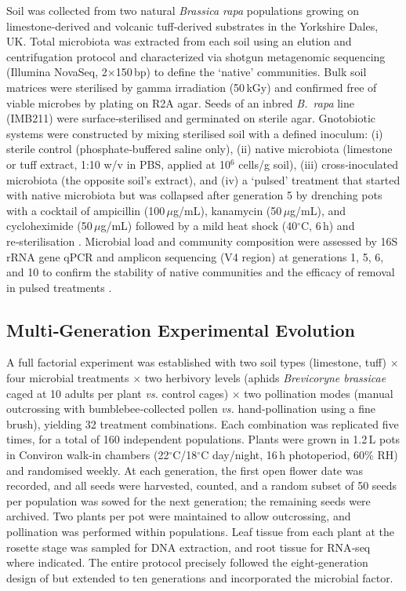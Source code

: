 \documentclass{article}
\begin{document}
Soil was collected from two natural \emph{Brassica rapa} populations growing on limestone‑derived and volcanic tuff‑derived substrates in the Yorkshire Dales, UK. Total microbiota was extracted from each soil using an elution and centrifugation protocol \cite{bulgarelli2013} and characterized via shotgun metagenomic sequencing (Illumina NovaSeq, 2$\times$150\,bp) to define the `native' communities. Bulk soil matrices were sterilised by gamma irradiation (50\,kGy) and confirmed free of viable microbes by plating on R2A agar. Seeds of an inbred \emph{B.~rapa} line (IMB211) were surface‑sterilised and germinated on sterile agar. Gnotobiotic systems were constructed by mixing sterilised soil with a defined inoculum: (i) sterile control (phosphate‑buffered saline only), (ii) native microbiota (limestone or tuff extract, 1:10 w/v in PBS, applied at 10$^6$ cells/g soil), (iii) cross‑inoculated microbiota (the opposite soil's extract), and (iv) a `pulsed' treatment that started with native microbiota but was collapsed after generation 5 by drenching pots with a cocktail of ampicillin (100\,$\mu$g/mL), kanamycin (50\,$\mu$g/mL), and cycloheximide (50\,$\mu$g/mL) followed by a mild heat shock (40$^{\circ}$C, 6\,h) and re‑sterilisation \cite{edwards2015, turner2013}. Microbial load and community composition were assessed by 16S rRNA gene qPCR and amplicon sequencing (V4 region) at generations 1, 5, 6, and 10 to confirm the stability of native communities and the efficacy of removal in pulsed treatments \cite{caporaso2010}.

\subsection{Multi‑Generation Experimental Evolution}

A full factorial experiment was established with two soil types (limestone, tuff) $\times$ four microbial treatments $\times$ two herbivory levels (aphids \emph{Brevicoryne brassicae} caged at 10 adults per plant \textit{vs.} control cages) $\times$ two pollination modes (manual outcrossing with bumblebee‑collected pollen \textit{vs.} hand‑pollination using a fine brush), yielding 32 treatment combinations. Each combination was replicated five times, for a total of 160 independent populations. Plants were grown in 1.2\,L pots in Conviron walk‑in chambers (22$^{\circ}$C/18$^{\circ}$C day/night, 16\,h photoperiod, 60\% RH) and randomised weekly. At each generation, the first open flower date was recorded, and all seeds were harvested, counted, and a random subset of 50 seeds per population was sowed for the next generation; the remaining seeds were archived. Two plants per pot were maintained to allow outcrossing, and pollination was performed within populations. Leaf tissue from each plant at the rosette stage was sampled for DNA extraction, and root tissue for RNA‑seq where indicated. The entire protocol precisely followed the eight‑generation design of \cite{johnson2023} but extended to ten generations and incorporated the microbial factor.
\end{document}

